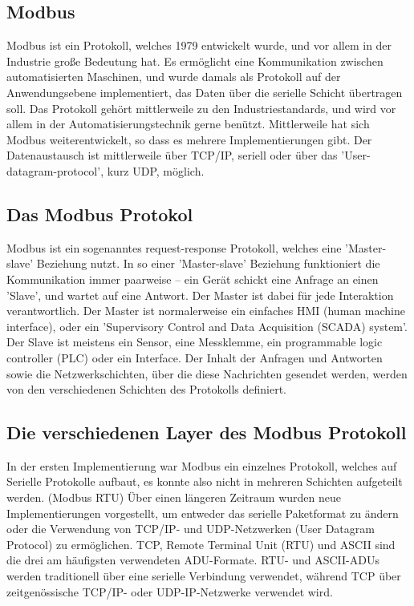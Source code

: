 \subsection{Modbus}\label{modbusprotokoll} 

Modbus ist ein Protokoll, welches 1979 entwickelt wurde, und vor allem in der Industrie große Bedeutung hat. Es ermöglicht eine Kommunikation zwischen automatisierten Maschinen, und wurde damals als Protokoll auf der Anwendungsebene implementiert, das Daten über die serielle Schicht übertragen soll. Das Protokoll gehört mittlerweile zu den Industriestandards, und wird vor allem in der Automatisierungstechnik gerne benützt. Mittlerweile hat sich Modbus weiterentwickelt, so dass es mehrere Implementierungen gibt. Der Datenaustausch ist mittlerweile über TCP/IP, seriell oder über das 'User-datagram-protocol', kurz UDP, möglich.
\cite{ModbusgrundlagenKubunu} \cite{modbuskubunu}

\subsection{Das Modbus Protokol}
Modbus ist ein sogenanntes request-response Protokoll, welches eine 'Master-slave' Beziehung nutzt. In so einer 'Master-slave' Beziehung funktioniert die Kommunikation immer paarweise – ein Gerät schickt eine Anfrage an einen 'Slave', und wartet auf eine Antwort. Der Master ist dabei für jede Interaktion verantwortlich. Der Master ist normalerweise ein einfaches HMI (human machine interface), oder ein 'Supervisory Control and Data Acquisition (SCADA) system'.  Der Slave ist meistens ein Sensor, eine Messklemme, ein programmable logic controller (PLC) oder ein Interface. Der Inhalt der Anfragen und Antworten sowie die Netzwerkschichten, über die diese Nachrichten gesendet werden, werden von den verschiedenen Schichten des Protokolls definiert. 
\cite{modbusoverserial}
\subsection{Die verschiedenen Layer des Modbus Protokoll }
In der ersten Implementierung war Modbus ein einzelnes Protokoll, welches auf Serielle Protokolle aufbaut, es konnte also nicht in mehreren Schichten aufgeteilt werden. (Modbus RTU) 
Über einen längeren Zeitraum wurden neue Implementierungen vorgestellt, um entweder das serielle Paketformat zu ändern oder die Verwendung von TCP/IP- und UDP-Netzwerken (User Datagram Protocol) zu ermöglichen. TCP, Remote Terminal Unit (RTU) und ASCII sind die drei am häufigsten verwendeten ADU-Formate. RTU- und ASCII-ADUs werden traditionell über eine serielle Verbindung verwendet, während TCP über zeitgenössische TCP/IP- oder UDP-IP-Netzwerke verwendet wird. 

